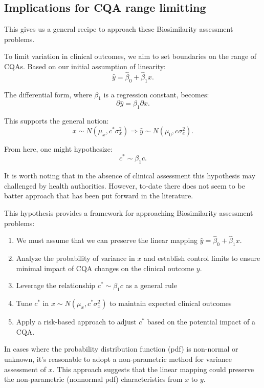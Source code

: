\documentclass[
  12pt,
  a4paper,
]{article}
\providecommand{\tightlist}{%
  \setlength{\itemsep}{0pt}\setlength{\parskip}{0pt}}
\numberwithin{equation}{section}
\theoremstyle{plain}
\theoremstyle{definition}
\theoremstyle{remark}
\theoremstyle{note}
\begin{document}
\hypertarget{implications-for-cqa-range-limitting}{%
\subsection{Implications for CQA range
limitting}\label{implications-for-cqa-range-limitting}}

This gives us a general recipe to approach these Biosimilarity
assessment problems.

To limit variation in clinical outcomes, we aim to set boundaries on the
range of CQAs. Based on our initial assumption of linearity: \[
\hat{y}=\hat{\beta}_0+\hat{\beta}_1 x .
\]

The differential form, where \(\beta_1\) is a regression constant,
becomes: \[
\partial \hat{y}=\beta_1 \partial x .
\]

This supports the general notion: \[
x \sim N\left(\mu_x, c^* \sigma_x^2\right) \Longrightarrow \hat{y} \sim N\left(\mu_0, c \sigma_e^2\right) .
\]

From here, one might hypothesize: \[
c^* \sim \beta_1 c .
\]

It is worth noting that in the absence of clinical assessment this
hypothesis may challenged by health authorities. However, to-date there
does not seem to be batter approach that has been put forward in the
literature.

This hypothesis provides a framework for approaching Biosimilarity
assessment problems:

\begin{enumerate}
\def\labelenumi{\arabic{enumi}.}
\tightlist
\item
  We must assume that we can preserve the linear mapping
  \(\hat{y}=\hat{\beta}_0+\hat{\beta}_1 x\).
\item
  Analyze the probability of variance in \(x\) and establish control
  limits to ensure minimal impact of CQA changes on the clinical outcome
  \(y\).
\item
  Leverage the relationship \(c^* \sim \beta_1 c\) as a general rule
\item
  Tune \(c^*\) in \(x \sim N\left(\mu_x, c^* \sigma_x^2\right)\) to
  maintain expected clinical outcomes
\item
  Apply a risk-based approach to adjust \(c^*\) based on the potential
  impact of a CQA.
\end{enumerate}

In cases where the probability distribution function (pdf) is non-normal
or unknown, it's reasonable to adopt a non-parametric method for
variance assessment of \(x\). This approach suggests that the linear
mapping could preserve the non-parametric (nonnormal pdf)
characteristics from \(x\) to \(y\).
\end{document}
